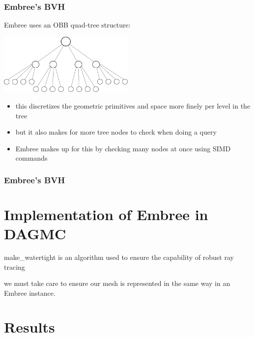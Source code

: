 \documentclass[12pt]{beamer}
\begin{document}
\begin{frame}

\frametitle{Embree's BVH}

Embree uses an OBB quad-tree structure:

\begin{center}
\includegraphics[width=0.5\textwidth]{./images/quad_tree.png}
\end{center}

\begin{itemize}
\item this discretizes the geometric primitives and space more finely per level in the tree
\item but it also makes for more tree nodes to check when doing a query
\item Embree makes up for this by checking many nodes at once using SIMD commands
\end{itemize}

\end{frame}


\begin{frame}
\frametitle{Embree's BVH}

\end{frame}



\section{Implementation of Embree in DAGMC} %
\begin{frame}
  make\_watertight \cite{make_watertight_smith_2010} is an algorithm used to ensure the capability of robust ray tracing


  we must take care to ensure our mesh is represented in the same way in an Embree instance. 
  

\end{frame}

\section{Results} %
\end{document}
